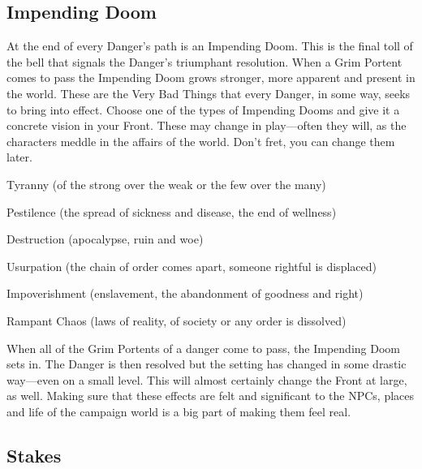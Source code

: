       
\subsection{Impending Doom}   
       

At the end of every Danger's path is an Impending Doom. This is the final toll of the bell that signals the Danger’s triumphant resolution. When a Grim Portent comes to pass the Impending Doom grows stronger, more apparent and present in the world. These are the Very Bad Things that every Danger, in some way, seeks to bring into effect. Choose one of the types of Impending Dooms and give it a concrete vision in your Front. These may change in play—often they will, as the characters meddle in the affairs of the world. Don't fret, you can change them later.

       
\startitemize[1,packed]
         
\item Tyranny (of the strong over the weak or the few over the many)

         
\item Pestilence (the spread of sickness and disease, the end of wellness)

         
\item Destruction (apocalypse, ruin and woe)

         
\item Usurpation (the chain of order comes apart, someone rightful is displaced)

         
\item Impoverishment (enslavement, the abandonment of goodness and right)

         
\item Rampant Chaos (laws of reality, of society or any order is dissolved)

       
\stopitemize
       

When all of the Grim Portents of a danger come to pass, the Impending Doom sets in. The Danger is then resolved but the setting has changed in some drastic way—even on a small level. This will almost certainly change the Front at large, as well. Making sure that these effects are felt and significant to the NPCs, places and life of the campaign world is a big part of making them feel real.

       
\subsection{Stakes}   
       

